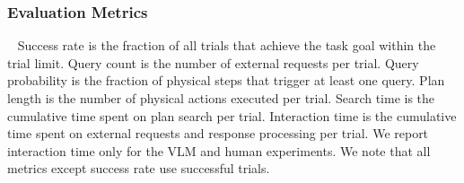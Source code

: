 \subsubsection{Evaluation Metrics}~\label{exp:metrics}
Success rate is the fraction of all trials that achieve the task goal within the trial limit. Query count is the number of external requests per trial. Query probability is the fraction of physical steps that trigger at least one query. Plan length is the number of physical actions executed per trial. Search time is the cumulative time spent on plan search per trial. Interaction time is the cumulative time spent on external requests and response processing per trial. We report interaction time only for the VLM and human experiments. We note that all metrics except success rate use successful trials.
